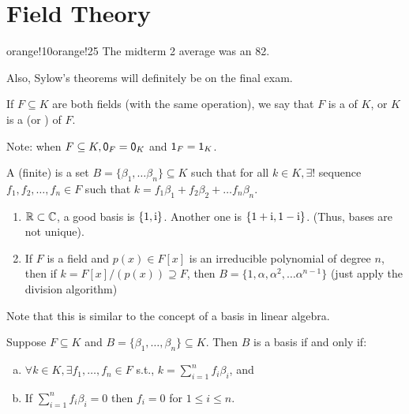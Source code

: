 \documentclass[notes.tex]{subfiles}
\begin{document}
\chapter{Field Theory}
\begin{classnote}{orange!10}{orange!25}
	The midterm 2 average was an 82.

	Also, Sylow's theorems will definitely be on the final exam.
\end{classnote}

\begin{defn}
	If $F\subseteq K$ are both fields (with the same operation), we say that $F$ is a  of $K$, or $K$ is a  (or ) of $F$.

	Note: when $F\subseteq K, \mathsf{0}_F = \mathsf{0}_K $ and $\mathsf{1}_F = \mathsf{1}_K$.
\end{defn}

\begin{defn}
	A (finite)  is a set $B = \{\beta_1, \ldots \beta_n\}\subseteq K$ such that for all $k\in K, \exists!$ sequence $f_1, f_2, \ldots, f_n\in F$ such that $k = f_1 \beta_1 + f_2 \beta_2 + \ldots f_n \beta_n$.
\end{defn}

\begin{eg}\leavevmode
	\begin{enumerate}
		\item $\mathbb{R}\subset\mathbb{C}$, a good basis is $\{1, \mathrm{i}\}$. Another one is $\{1+\mathrm{i}, 1-\mathrm{i}\}$. (Thus, bases are not unique).
		\item If $F$ is a field and $p(x) \in F[x]$ is an irreducible polynomial of degree $n$, then if $k = F[x]/(p(x))\supseteq F$, then $B = \{1, \alpha, \alpha^2, \ldots \alpha^{n-1}\}$ (just apply the division algorithm)
	\end{enumerate}
	Note that this is similar to the concept of a basis in linear algebra.
\end{eg}
	
\begin{proposition}
	\label{basisiffzerothing}
	Suppose $F\subseteq K$ and $B = \{\beta_1, \ldots, \beta_n\}\subseteq K$. Then $B$ is a basis if and only if:
	\begin{enumerate}[(a)]
		\item $\forall k\in K, \exists f_1, \ldots, f_n\in F$ s.t., $k = \sum_{i=1}^n f_i \beta_i$, and
		\item If $\sum_{i=1}^n f_i \beta_i = 0$ then $f_i = 0$ for $1\le i \le n$.
	\end{enumerate}
\end{proposition}
\end{document}

